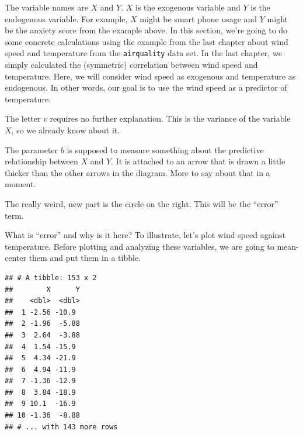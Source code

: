 \documentclass[
]{book}
\newenvironment{Shaded}{\begin{snugshade}}{\end{snugshade}}
\newcommand{\FunctionTok}[1]{\textcolor[rgb]{0.00,0.00,0.00}{#1}}
\newcommand{\NormalTok}[1]{#1}
\newcommand{\OtherTok}[1]{\textcolor[rgb]{0.56,0.35,0.01}{#1}}
\newcommand{\SpecialCharTok}[1]{\textcolor[rgb]{0.00,0.00,0.00}{#1}}
\begin{document}
The variable names are \(X\) and \(Y\). \(X\) is the exogenous variable and \(Y\) is the endogenous variable. For example, \(X\) might be smart phone usage and \(Y\) might be the anxiety score from the example above. In this section, we're going to do some concrete calculations using the example from the last chapter about wind speed and temperature from the \texttt{airquality} data set. In the last chapter, we simply calculated the (symmetric) correlation between wind speed and temperature. Here, we will consider wind speed as exogenous and temperature as endogenous. In other words, our goal is to use the wind speed as a predictor of temperature.

The letter \(v\) requires no further explanation. This is the variance of the variable \(X\), so we already know about it.

The parameter \(b\) is supposed to measure something about the predictive relationship between \(X\) and \(Y\). It is attached to an arrow that is drawn a little thicker than the other arrows in the diagram. More to say about that in a moment.

The really weird, new part is the circle on the right. This will be the ``error'' term.

What is ``error'' and why is it here? To illustrate, let's plot wind speed against temperature. Before plotting and analyzing these variables, we are going to mean-center them and put them in a tibble.

\begin{Shaded}
\end{Shaded}

\begin{verbatim}
## # A tibble: 153 x 2
##        X      Y
##    <dbl>  <dbl>
##  1 -2.56 -10.9 
##  2 -1.96  -5.88
##  3  2.64  -3.88
##  4  1.54 -15.9 
##  5  4.34 -21.9 
##  6  4.94 -11.9 
##  7 -1.36 -12.9 
##  8  3.84 -18.9 
##  9 10.1  -16.9 
## 10 -1.36  -8.88
## # ... with 143 more rows
\end{verbatim}
\end{document}

